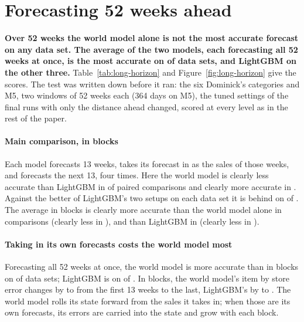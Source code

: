 \documentclass[10pt,twocolumn,letterpaper]{article}
\begin{document}

\section{Forecasting 52 weeks ahead}

\textbf{Over 52 weeks the world model alone is not the most accurate forecast on any
data set. The average of the two models, each forecasting all 52 weeks at once, is
the most accurate on \lhLowestAvgDirect{} of \lhSets{} data sets, and LightGBM on the other three.}
Table~\ref{tab:long-horizon} and Figure~\ref{fig:long-horizon} give the scores. The test
was written down before it ran: the six Dominick's categories and M5, two windows of
52 weeks each (364 days on M5), the tuned settings of the final runs with only the
distance ahead changed, scored at every level as in the rest of the paper.

\paragraph{Main comparison, in blocks}
Each model forecasts 13 weeks, takes its forecast in as the sales of those weeks,
and forecasts the next 13, four times. Here the world model is clearly less
accurate than LightGBM in \lhPWmWorse{} of \lhPN{} paired comparisons and clearly more
accurate in \lhPWmBetter{}. Against the better of LightGBM's two setups on each data set it
is behind on \lhLgbBestBeatsWm{} of \lhSets{}. The average in blocks is clearly more accurate
than the world model alone in \lhPAvgWmBetter{} comparisons (clearly less in \lhPAvgWmWorse{}), and
than LightGBM in \lhPAvgLgbBetter{} (clearly less in \lhPAvgLgbWorse{}).

\paragraph{Taking in its own forecasts costs the world model most}
Forecasting all 52 weeks at once, the world model is more accurate than in blocks on
\lhDirectBeatsBlocksWm{} of \lhDirectSetsWm{} data sets; LightGBM is on \lhDirectBeatsBlocksLgb{} of \lhDirectSetsLgb{}. In blocks, the
world model's item by store error changes by \lhGrowWmLo{} to \lhGrowWmHi{} from the first 13
weeks to the last, LightGBM's by \lhGrowLgbLo{} to \lhGrowLgbHi{}. The world model rolls its state
forward from the sales it takes in; when those are its own forecasts, its errors are
carried into the state and grow with each block.
\end{document}
